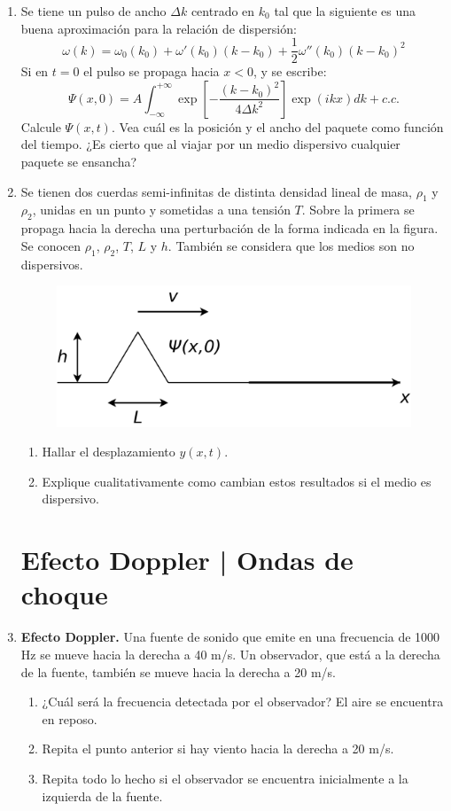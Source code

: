\documentclass[11pt,spanish,a4paper]{article}
\begin{document}
\begin{enumerate}
\item Se tiene un pulso de ancho $\Delta k$ centrado en $k_{0}$ tal que
la siguiente es una buena aproximación para la relación de dispersión:
\[
\omega(k)=\omega_{0}(k_{0})+\omega'(k_{0})(k-k_{0})+\frac{1}{2}\omega''(k_{0})(k-k_{0})^{2}
\]
Si en $t=0$ el pulso se propaga hacia $x<0$, y se escribe:
\[
\Psi(x,0)=A\int_{-\infty}^{+\infty}\exp\left[-\frac{(k-k_{0})^{2}}{4\Delta k^{2}}\right]\exp\left(ikx\right)dk+c.c.
\]
Calcule $\Psi(x,t)$. Vea cuál es la posición y el ancho del paquete
como función del tiempo. ¿Es cierto que al viajar por un medio dispersivo
cualquier paquete se ensancha?


\item Se tienen dos cuerdas semi-infinitas de distinta densidad lineal
de masa, $\rho_{1}$ y $\rho_{2}$, unidas en un punto y sometidas
a una tensión $T$. Sobre la primera se propaga hacia la derecha una
perturbación de la forma indicada en la figura. Se conocen $\rho_{1}$,
$\rho_{2}$, $T$, $L$ y $h$. También se considera que los medios
son no dispersivos.
\begin{figure}[H]
\centering{}\includegraphics[clip,scale=0.25]{ej2-20}
\end{figure}
\begin{enumerate}
\item Hallar el desplazamiento $y(x,t)$.
\item Explique cualitativamente como cambian estos resultados si el medio
es dispersivo.
\end{enumerate}


\section*{Efecto Doppler | Ondas de choque}

\item \textbf{Efecto Doppler.} Una fuente de sonido que emite en una frecuencia
de 1000 Hz se mueve hacia la derecha a 40 m/s. Un observador, que
está a la derecha de la fuente, también se mueve hacia la derecha
a 20 m/s.
\begin{enumerate}
\item ¿Cuál será la frecuencia detectada por el observador? El aire se encuentra
en reposo.
\item Repita el punto anterior si hay viento hacia la derecha a 20 m/s.
\item Repita todo lo hecho si el observador se encuentra inicialmente a
la izquierda de la fuente.
\end{enumerate}




\end{enumerate}
\end{document}
